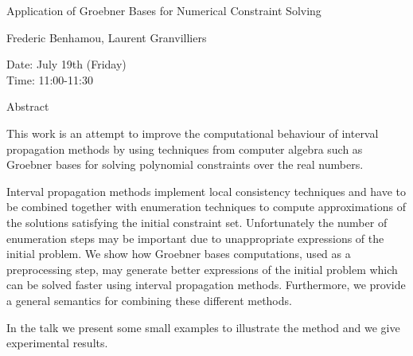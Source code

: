 \begin{center}
\LARGE
Application of Groebner Bases for Numerical Constraint
                             Solving

\end{center}

\begin{center}
\Large
Frederic Benhamou, Laurent Granvilliers

\end{center}

\noindent
Date:  July 19th (Friday)\\
Time:  11:00-11:30\\

\begin{center}
\large
Abstract
\end{center}

This work is an attempt to improve the computational behaviour of interval propagation methods
by using techniques from computer algebra such as Groebner bases for solving polynomial
constraints over the real numbers. 

Interval propagation methods implement local consistency techniques and have to be combined
together with enumeration techniques to compute approximations of the solutions satisfying the
initial constraint set. Unfortunately the number of enumeration steps may be important due to
unappropriate expressions of the initial problem. We show how Groebner bases computations,
used as a preprocessing step, may generate better expressions of the initial problem which can be
solved faster using interval propagation methods. Furthermore, we provide a general semantics for
combining these different methods. 

In the talk we present some small examples to illustrate the method and we give experimental
results. 

